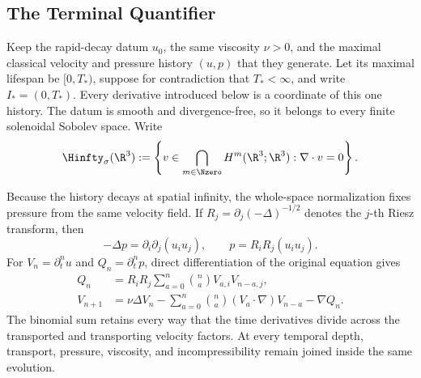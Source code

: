 \subsection{The Terminal Quantifier}\label{sub:TheTerminalQuantifier}

Keep the rapid-decay datum \(u_0\), the same viscosity \(\nu>0\), and the maximal classical velocity and pressure history \((u,p)\) that they generate.
Let its maximal lifespan be \([0,T_*)\), suppose for contradiction that \(T_*<\infty\), and write \(I_*=(0,T_*)\).
Every derivative introduced below is a coordinate of this one history.
The datum is smooth and divergence-free, so it belongs to every finite solenoidal Sobolev space.
Write
\begin{equation}\label{eq:SectionThreeSmoothSolenoidalClass}
  \Hinfty_\sigma(\R^3)
  :=
  \left\{
    v\in\bigcap_{m\in\Nzero}H^m(\R^3;\R^3)
    :\nabla\cdot v=0
  \right\}.
\end{equation}

Because the history decays at spatial infinity, the whole-space normalization fixes pressure from the same velocity field.
If \(R_j=\partial_j(-\Delta)^{-1/2}\) denotes the \(j\)-th Riesz transform, then
\begin{equation}\label{eq:SectionThreePressureNormalization}
  -\Delta p=\partial_i\partial_j(u_i u_j),
  \qquad
  p=R_iR_j(u_i u_j).
\end{equation}
For \(V_n=\partial_t^n u\) and \(Q_n=\partial_t^n p\), direct differentiation of the original equation gives
\begin{align}
  Q_n
  &=R_iR_j\sum_{a=0}^{n}\binom{n}{a}V_{a,i}V_{n-a,j},
  \label{eq:SectionThreePressureRecurrence}\\
  V_{n+1}
  &=\nu\Delta V_n
  -\sum_{a=0}^{n}\binom{n}{a}(V_a\cdot\nabla)V_{n-a}
  -\nabla Q_n.
  \label{eq:SectionThreeVelocityRecurrence}
\end{align}
The binomial sum retains every way that the time derivatives divide across the transported and transporting velocity factors.
At every temporal depth, transport, pressure, viscosity, and incompressibility remain joined inside the same evolution.


